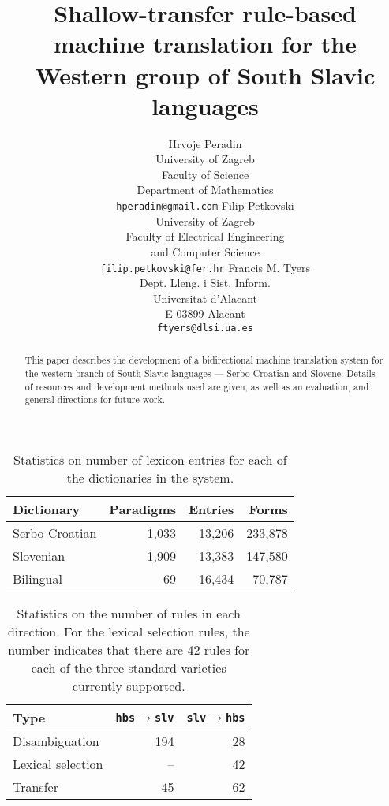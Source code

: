 \documentclass[11pt]{article}
\title{Shallow-transfer rule-based machine translation for the Western group of South Slavic languages}
\author{Hrvoje Peradin\\
  University of Zagreb\\
  Faculty of Science\\
  Department of Mathematics\\
  {\tt hperadin@gmail.com}  \And
  Filip Petkovski \\
  University of Zagreb\\
  Faculty of Electrical Engineering\\
  and Computer Science\\
  {\tt filip.petkovski@fer.hr}  \And
  Francis M. Tyers\\
  Dept. Lleng. i Sist. Inform.\\
  Universitat d'Alacant\\
  E-03899 Alacant\\
  {\tt ftyers@dlsi.ua.es}}
\date{}
\newcommand{\todo}[1]{\{\textbf{TODO: #1}\}}
\begin{document}
\maketitle
\begin{abstract}
  This paper describes the development of a bidirectional machine
  translation system for the western branch of South-Slavic languages
  --- Serbo-Croatian and Slovene. Details of
  resources and development methods used are given, as well as an
  evaluation, and general directions for future work.
\end{abstract}








\begin{table}

\begin{center}
\begin{tabular}{|l|rrr|}
\hline
\textbf{Dictionary} & \textbf{Paradigms} & \textbf{Entries} & \textbf{Forms} \\
\hline
Serbo-Croatian &  1,033 & 13,206 & 233,878 \\
Slovenian &  1,909 & 13,383 & 147,580 \\
\hline
Bilingual &  69 &  16,434 & 70,787 \\
\hline
\end{tabular}
\caption{Statistics on number of lexicon entries for each of the dictionaries in the 
   system.}
\end{center}

\end{table}

\begin{table}
\begin{center}
\begin{tabular}{|l|rr|}
\hline
 \textbf{Type}      & \texttt{hbs}$\rightarrow$\texttt{slv} & \texttt{slv}$\rightarrow$\texttt{hbs}\\
\hline
Disambiguation      &     194              &     28 \\
Lexical selection   &     --            &  42 \\
Transfer            &                45 &  62 \\
\hline

\end{tabular}
 \caption{Statistics on the number of rules in each direction. For the lexical selection rules, 
   the number indicates that there are 42 rules for each of the three standard varieties currently
   supported.}
\end{center}
\end{table}
\end{document}
